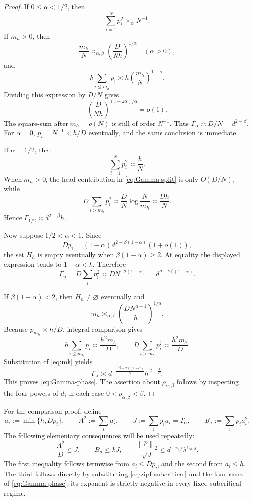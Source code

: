 \documentclass[11pt]{article}
\theoremstyle{remark}
\newcommand{\norm}[1]{\left\lVert #1\right\rVert}
\begin{document}
\begin{proof}
If \(0\leq\alpha<1/2\), then
\[
 \sum_{i=1}^Np_i^2\asymp_\alpha N^{-1}.
\]
If \(m_h>0\), then
\[
 \frac{m_h}{N}
 \asymp_{\alpha,\beta}
 \left(\frac{D}{Nh}\right)^{1/\alpha}
 \quad(\alpha>0),
\]
and
\[
 h\sum_{i\leq m_h}p_i
 \asymp h\left(\frac{m_h}{N}\right)^{1-\alpha}.
\]
Dividing this expression by \(D/N\) gives
\[
 \left(\frac{D}{Nh}\right)^{(1-2\alpha)/\alpha}=o(1).
\]
The square-sum after \(m_h=o(N)\) is still of order \(N^{-1}\).
Thus \(\Gamma_\alpha\asymp D/N=d^{2-\beta}\).
For \(\alpha=0\), \(p_i=N^{-1}<h/D\) eventually, and the same
conclusion is immediate.

If \(\alpha=1/2\), then
\[
 \sum_{i=1}^Np_i^2\asymp\frac{h}{N}.
\]
When \(m_h>0\), the head contribution in
\eqref{eq:Gamma-split} is only \(O(D/N)\), while
\[
 D\sum_{i>m_h}p_i^2
 \asymp\frac{D}{N}\log\frac{N}{m_h}
 \asymp\frac{Dh}{N}.
\]
Hence \(\Gamma_{1/2}\asymp d^{2-\beta}h\).

Now suppose \(1/2<\alpha<1\).  Since
\[
 Dp_1=(1-\alpha)d^{\,2-\beta(1-\alpha)}(1+o(1)),
\]
the set \(H_h\) is empty eventually when
\(\beta(1-\alpha)\geq2\).  At equality the displayed expression tends
to \(1-\alpha<h\).  Therefore
\[
 \Gamma_\alpha
 =D\sum_i p_i^2
 \asymp DN^{-2(1-\alpha)}
 =d^{\,2-2\beta(1-\alpha)}.
\]

If \(\beta(1-\alpha)<2\), then \(H_h\neq\varnothing\) eventually and
\begin{equation}
 m_h
 \asymp_{\alpha,\beta}
 \left(\frac{DN^{\alpha-1}}{h}\right)^{1/\alpha}.
 \label{eq:mh}
\end{equation}
Because \(p_{m_h}\asymp h/D\), integral comparison gives
\[
 h\sum_{i\leq m_h}p_i
 \asymp\frac{h^2m_h}{D},
 \qquad
 D\sum_{i>m_h}p_i^2
 \asymp\frac{h^2m_h}{D}.
\]
Substitution of \eqref{eq:mh} yields
\[
 \Gamma_\alpha
 \asymp
 d^{-\frac{(\beta-2)(1-\alpha)}{\alpha}}
 h^{\,2-\frac1\alpha}.
\]
This proves \eqref{eq:Gamma-phase}.  The assertion about
\(\rho_{\alpha,\beta}\) follows by inspecting the four powers of
\(d\); in each case \(0<\rho_{\alpha,\beta}<\beta\).
\end{proof}

For the comparison proof, define
\begin{equation}
 a_i:=\min\{h,Dp_i\},\qquad
 A^2:=\sum_i a_i^2,\qquad
 J:=\sum_i p_ia_i=\Gamma_\alpha,\qquad
 B_a:=\sum_i p_i a_i^2.
 \label{eq:a-def}
\end{equation}
The following elementary consequences will be used repeatedly:
\begin{equation}
 \frac{A^2}{D}\leq J,\qquad
 B_a\leq hJ,\qquad
 \frac{\norm p_2}{\sqrt J}
 \leq d^{-c_{\alpha,\beta}}h^{C_{\alpha,\beta}}.
 \label{eq:aux-arithmetic}
\end{equation}
The first inequality follows termwise from \(a_i\leq Dp_i\), and the
second from \(a_i\leq h\).  The third follows directly by substituting
\eqref{eq:zipf-subcritical} and the four cases of
\eqref{eq:Gamma-phase}; its exponent is strictly negative in every
fixed subcritical regime.
\end{document}
